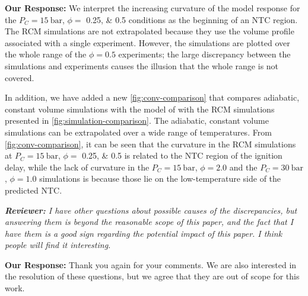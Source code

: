\documentclass{article}
\newenvironment{reviewer}{\vspace{0.5\baselineskip}\begingroup\itshape\textbf{Reviewer:}}{\endgroup\vspace{0.5\baselineskip}}
\newenvironment{response}{\vspace{0.5\baselineskip}\textbf{Our Response:}}{\vspace{0.5\baselineskip}}
\begin{document}
\begin{response}
    We interpret the increasing curvature of the model response for the $P_C = \SI{15}{\bar}$, $\phi =$
    \numlist{0.25;0.5} conditions as the beginning of an NTC region. The RCM simulations are not
    extrapolated because they use the volume profile associated with a single experiment. However,
    the simulations are plotted over the whole range of the $\phi = \num{0.5}$ experiments; the
    large discrepancy between the simulations and experiments causes the illusion that the whole
    range is not covered.

    In addition, we have added a new \cref{fig:conv-comparison} that compares adiabatic, constant
    volume simulations with the model of \citet{Dievart2013} with the RCM simulations presented in
    \cref{fig:simulation-comparison}. The adiabatic, constant volume simulations can be extrapolated
    over a wide range of temperatures. From \cref{fig:conv-comparison}, it can be seen that the
    curvature in the RCM simulations at $P_C = \SI{15}{\bar}$, $\phi =$ \numlist{0.25;0.5} is
    related to the NTC region of the ignition delay, while the lack of curvature in the $P_C =
    \SI{15}{\bar}$, $\phi = \num{2.0}$ and the $P_C = \SI{30}{\bar}$, $\phi = \num{1.0}$ simulations
    is because those lie on the low-temperature side of the predicted NTC.
\end{response}

\begin{reviewer}
    I have other questions about possible causes of the discrepancies, but answering them is beyond
    the reasonable scope of this paper, and the fact that I have them is a good sign regarding the
    potential impact of this paper. I think people will find it interesting.
\end{reviewer}

\begin{response}
    Thank you again for your comments. We are also interested in the resolution of these questions,
    but we agree that they are out of scope for this work.
\end{response}
\end{document}
